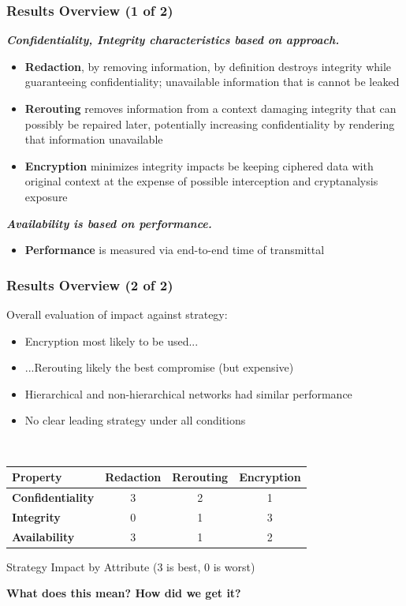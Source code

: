 \documentclass[t,handout]{beamer}
\begin{document}
\begin{frame}
\frametitle{Results Overview (1 of 2)}
{\bf \textit{Confidentiality, Integrity characteristics based on approach.}} \\
\begin{itemize}
\item {\small {\bf Redaction}, by removing information, by definition destroys integrity while guaranteeing confidentiality; unavailable information that is cannot be leaked}
\item {\small {\bf Rerouting} removes information from a context damaging integrity that can possibly be repaired later, potentially increasing confidentiality by rendering that information unavailable}
\item {\small {\bf Encryption} minimizes integrity impacts be keeping ciphered data with original context at the expense of possible interception and cryptanalysis exposure}
\end{itemize}
{\bf \textit{Availability is based on performance.}} \\
\begin{itemize}
\item {\small {\bf Performance} is measured via end-to-end time of transmittal}
\end{itemize}
\end{frame}

\begin{frame}
\frametitle{Results Overview (2 of 2)}
Overall evaluation of impact against strategy:
\begin{itemize}
\item {\small Encryption most likely to be used...}
\item {\small ...Rerouting likely the best compromise (but expensive)}
\item {\small Hierarchical and non-hierarchical networks had similar performance}
\item {\small No clear leading strategy under all conditions}
\end{itemize}
~\\
\centering %
\begin{tabular}{lccc}
\toprule %
{\bf Property}			& {\bf Redaction}	& {\bf Rerouting} 	& {\bf Encryption} 	\\\toprule
{\bf Confidentiality} 	& 3				  	& 2					& 1				 	\\\midrule
{\bf Integrity}			& 0					& 1					& 3 					\\\midrule
{\bf Availability}		& 3					& 1					& 2					\\\bottomrule
\end{tabular}
\label{table:model:evaluation}
\begin{center}
{\scriptsize Strategy Impact by Attribute (3 is best, 0 is worst)}
\end{center}
\begin{center}
{\bf What does this mean? How did we get it?}
\end{center}
\end{frame}
\end{document}
